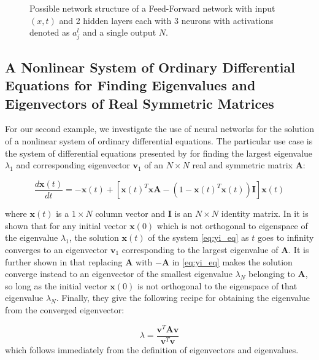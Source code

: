 \documentclass[reprint, english, nofootinbib]{revtex4-2}
\begin{document}
\begin{figure}[h!tb]
   \center
    
   \caption{Possible network structure of a Feed-Forward network with input $(x,t)$ and 2 hidden layers each with 3 neurons with activations denoted as $a^l_j$ and a single output $N$.}
\end{figure}


\subsection{A Nonlinear System of Ordinary Differential Equations for Finding Eigenvalues and Eigenvectors of Real Symmetric Matrices}

For our second example, we investigate the use of neural networks for the solution of a nonlinear system of ordinary differential equations. The particular use case is the system of differential equations presented by \cite{Yi_2004} for finding the largest eigenvalue $\lambda_{1}$ and corresponding eigenvector $\mathbf{v}_1$ of an $N \times N$ real and symmetric matrix $\mathbf{A}$:

\begin{equation}
\label{eq:yi_eq}
\frac{d \mathbf{x}(t)}{dt} = - \mathbf{x}(t) + [\mathbf{x}(t)^T \mathbf{x} \mathbf{A} - (1 - \mathbf{x}(t)^T \mathbf{x}(t)) \mathbf{I} ] \mathbf{x}(t)
\end{equation}

where $\mathbf{x}(t)$ is a $ 1 \times N$ column vector and $\mathbf{I}$ is an $N \times N$ identity matrix. In \cite{Yi_2004} it is shown that for any initial vector $\mathbf{x}(0)$ which is not orthogonal to eigenspace of the eigenvalue $\lambda_1$, the solution $\mathbf{x}(t)$ of the system \ref{eq:yi_eq} as $t$ goes to infinity converges to an eigenvector $\mathbf{v}_1$ corresponding to the largest eigenvalue of $\mathbf{A}$. It is further shown in \cite{Yi_2004} that replacing $\mathbf{A}$ with $\mathbf{-A}$ in \ref{eq:yi_eq} makes the solution converge instead to an eigenvector of the smallest eigenvalue $\lambda_N$ belonging to $\mathbf{A}$, so long as the initial vector $\mathbf{x}(0)$ is not orthogonal to the eigenspace of that eigenvalue $\lambda_N$. Finally, they give the following recipe for obtaining the eigenvalue from the converged eigenvector:

\begin{equation}
\label{eq:yi_eigenvalue}
\lambda = \frac{\mathbf{v}^T \mathbf{A} \mathbf{v}}{\mathbf{v}^T \mathbf{v}}
\end{equation}
which follows immediately from the definition of eigenvectors and eigenvalues.
\end{document}
